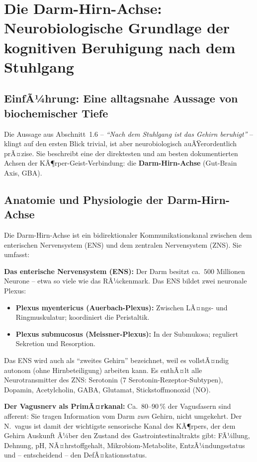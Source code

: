 ﻿\documentclass[12pt,a4paper]{report}
\theoremstyle{plain}
\theoremstyle{definition}
\theoremstyle{remark}
\begin{document}
	\section{Die Darm-Hirn-Achse: Neurobiologische Grundlage der kognitiven Beruhigung nach dem Stuhlgang}

	\subsection{EinfÃ¼hrung: Eine alltagsnahe Aussage von biochemischer Tiefe}

	Die Aussage aus Abschnitt~1.6 -- \emph{``Nach dem Stuhlgang ist das
	Gehirn beruhigt''} -- klingt auf den ersten Blick trivial,
	ist aber neurobiologisch auÃŸerordentlich prÃ¤zise.
	Sie beschreibt eine der direktesten und am besten dokumentierten
	Achsen der KÃ¶rper-Geist-Verbindung: die \textbf{Darm-Hirn-Achse}
	(Gut-Brain Axis, GBA).

	\subsection{Anatomie und Physiologie der Darm-Hirn-Achse}

	Die Darm-Hirn-Achse ist ein bidirektionaler Kommunikationskanal
	zwischen dem enterischen Nervensystem (ENS) und dem zentralen
	Nervensystem (ZNS). Sie umfasst:

	\textbf{Das enterische Nervensystem (ENS):}
	Der Darm besitzt ca.\ $500$ Millionen Neurone --
	etwa so viele wie das RÃ¼ckenmark. Das ENS bildet zwei
	neuronale Plexus:
	\begin{itemize}
		\item \textbf{Plexus myentericus (Auerbach-Plexus):}
		Zwischen LÃ¤ngs- und Ringmuskulatur; koordiniert die
		Peristaltik.
		\item \textbf{Plexus submucosus (Meissner-Plexus):}
		In der Submukosa; reguliert Sekretion und Resorption.
	\end{itemize}
	Das ENS wird auch als ``zweites Gehirn'' bezeichnet,
	weil es vollstÃ¤ndig autonom (ohne Hirnbeteiligung) arbeiten kann.
	Es enthÃ¤lt alle Neurotransmitter des ZNS:
	Serotonin (7 Serotonin-Rezeptor-Subtypen),
	Dopamin, Acetylcholin, GABA, Glutamat, Stickstoffmonoxid (NO).

	\textbf{Der Vagusnerv als PrimÃ¤rkanal:}
	Ca.\ $80$--$90\,\%$ der Vagusfasern sind afferent:
	Sie tragen Information vom Darm \emph{zum} Gehirn,
	nicht umgekehrt. Der N.\ vagus ist damit der wichtigste
	sensorische Kanal des KÃ¶rpers, der dem Gehirn Auskunft
	Ã¼ber den Zustand des Gastrointestinaltrakts gibt:
	FÃ¼llung, Dehnung, pH, NÃ¤hrstoffgehalt, Mikrobiom-Metabolite,
	EntzÃ¼ndungsstatus und -- entscheidend -- den DefÃ¤kationsstatus.
\end{document}
